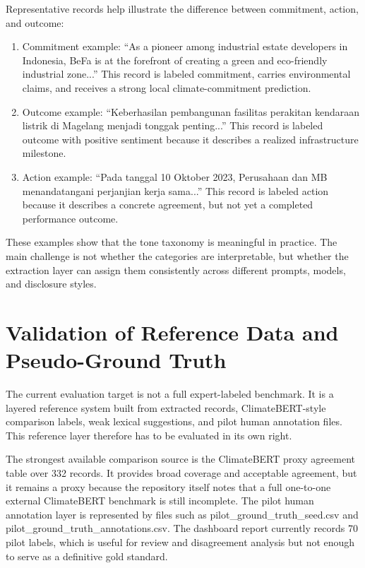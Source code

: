 Representative records help illustrate the difference between commitment, action, and outcome:
\begin{enumerate}
\item 

Commitment example: “As a pioneer among industrial estate developers in Indonesia, BeFa is at the forefront of creating a green and eco-friendly industrial zone...” This record is labeled commitment, carries environmental claims, and receives a strong local climate-commitment prediction.\item 

Outcome example: “Keberhasilan pembangunan fasilitas perakitan kendaraan listrik di Magelang menjadi tonggak penting...” This record is labeled outcome with positive sentiment because it describes a realized infrastructure milestone.\item 

Action example: “Pada tanggal 10 Oktober 2023, Perusahaan dan MB menandatangani perjanjian kerja sama...” This record is labeled action because it describes a concrete agreement, but not yet a completed performance outcome.
\end{enumerate}

These examples show that the tone taxonomy is meaningful in practice. The main challenge is not whether the categories are interpretable, but whether the extraction layer can assign them consistently across different prompts, models, and disclosure styles.
\section{Validation of Reference Data and Pseudo-Ground Truth}

The current evaluation target is not a full expert-labeled benchmark. It is a layered reference system built from extracted records, ClimateBERT-style comparison labels, weak lexical suggestions, and pilot human annotation files. This reference layer therefore has to be evaluated in its own right.

The strongest available comparison source is the ClimateBERT proxy agreement table over 332 records. It provides broad coverage and acceptable agreement, but it remains a proxy because the repository itself notes that a full one-to-one external ClimateBERT benchmark is still incomplete. The pilot human annotation layer is represented by files such as pilot\_ground\_truth\_seed.csv and pilot\_ground\_truth\_annotations.csv. The dashboard report currently records 70 pilot labels, which is useful for review and disagreement analysis but not enough to serve as a definitive gold standard.

